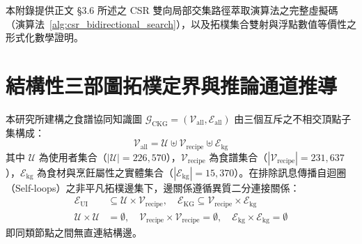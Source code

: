 
\label{app:csr_proof}

本附錄提供正文 §3.6 所述之 CSR 雙向局部交集路徑萃取演算法之完整虛擬碼（演算法~\ref{alg:csr_bidirectional_search}），以及拓樸集合雙射與浮點數值等價性之形式化數學證明。

\section{結構性三部圖拓樸定界與推論通道推導}

本研究所建構之食譜協同知識圖 $\mathcal{G}_{\text{CKG}} = (\mathcal{V}_{\text{all}}, \mathcal{E}_{\text{all}})$ 由三個互斥之不相交頂點子集構成：
\begin{equation}
  \mathcal{V}_{\text{all}} = \mathcal{U} \uplus \mathcal{V}_{\text{recipe}} \uplus \mathcal{E}_{\text{kg}}
\end{equation}
其中 $\mathcal{U}$ 為使用者集合（$|\mathcal{U}| = 226,570$），$\mathcal{V}_{\text{recipe}}$ 為食譜集合（$|\mathcal{V}_{\text{recipe}}| = 231,637$），$\mathcal{E}_{\text{kg}}$ 為食材與烹飪屬性之實體集合（$|\mathcal{E}_{\text{kg}}| = 15,370$）。在排除訊息傳播自迴圈（Self-loops）之非平凡拓樸邊集下，邊關係遵循異質二分連接關係：
\begin{align}
  \mathcal{E}_{\text{UI}} &\subseteq \mathcal{U} \times \mathcal{V}_{\text{recipe}}, \quad \mathcal{E}_{\text{KG}} \subseteq \mathcal{V}_{\text{recipe}} \times \mathcal{E}_{\text{kg}} \\
  \mathcal{U} \times \mathcal{U} &= \emptyset, \quad \mathcal{V}_{\text{recipe}} \times \mathcal{V}_{\text{recipe}} = \emptyset, \quad \mathcal{E}_{\text{kg}} \times \mathcal{E}_{\text{kg}} = \emptyset
\end{align}
即同類節點之間無直連結構邊。

